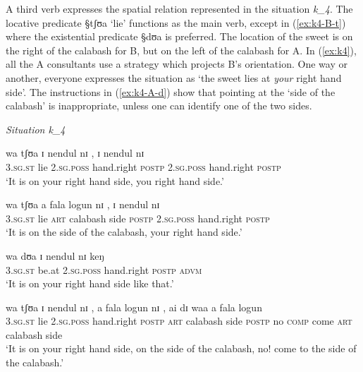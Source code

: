 A third verb  expresses the spatial relation represented in the situation {\it
k_{4}}. The locative predicate {\S tʃʊa} `lie' functions as the main verb,
except in (\ref{ex:k4-B-t}) where the existential predicate {\S dʊa} is
preferred.  The location of the sweet is on the right of the calabash for B, but
on the left of the calabash for A.  In (\ref{ex:k4}), all the A consultants use
a strategy which projects B's orientation. One way or another, everyone
expresses
the situation as `the sweet lies at {\it your} right hand side'. The 
instructions in (\ref{ex:k4-A-d}) show that pointing at the `side of the
calabash' is inappropriate, unless one can identify one of the two sides. 


\begin{exe}
\ex\label{ex:k4}\textit{Situation {\it k_{4}}}\\
 \begin{xlist}
  \ex\label{ex:k4-A-w}
\gll  wa tʃʊa ɪ nendul nɪ , ɪ nendul nɪ\\
\textsc{3.sg.st} lie \textsc{2.sg.poss} hand.right \textsc{postp} {}
\textsc{2.sg.poss} hand.right \textsc{postp} \\

\glt `It is on your right hand side, you right hand side.'

\ex\label{ex:k4-A-d}
\gll  wa tʃʊa a fala logun nɪ , ɪ nendul nɪ\\
\textsc{3.sg.st} lie \textsc{art} calabash side  \textsc{postp}  {}
\textsc{2.sg.poss} hand.right \textsc{postp}\\

\glt `It is on the side of the calabash, your right hand side.'

\ex\label{ex:k4-B-t}
\gll  wa dʊa ɪ nendul nɪ keŋ\\
\textsc{3.sg.st} be.at \textsc{2.sg.poss} hand.right \textsc{postp}
\textsc{advm}\\
\glt `It is on your right hand side like that.'


\ex\label{ex:k4-B-m}
\gll  wa tʃʊa ɪ nendul nɪ , a fala logun nɪ , ai dɪ waa a fala logun \\
\textsc{3.sg.st} lie \textsc{2.sg.poss} hand.right \textsc{postp} {}
\textsc{art}
calabash side  \textsc{postp}  {} no  \textsc{comp} come \textsc{art} calabash
side\\
\glt `It is on your right hand side, on the side of the calabash, no! come to
the side of the calabash.'

 \end{xlist}

\end{exe}



